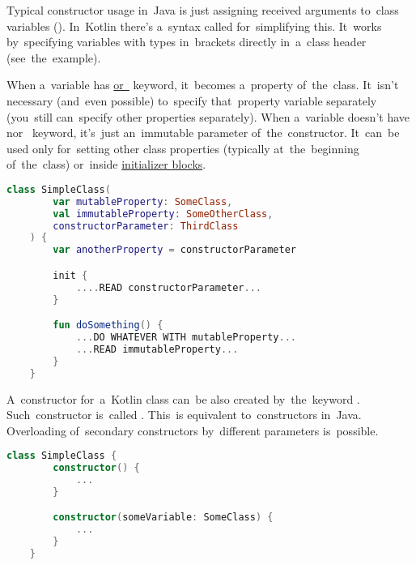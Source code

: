 \label{kotlinconstructor}
\label{kotlinprimaryconstructor}
Typical constructor usage in~Java is just assigning received arguments to~class variables ().
In~Kotlin there's a~syntax called  for~simplifying this.
It~works by~specifying variables with types in~brackets directly in~a~class header (see~the~example).

When a~variable has \hyperref[kotlinvalvar]{ or~} keyword, it~becomes \mbox{a property} of~the~class.
It~isn't necessary (and~even possible) to~specify that~property variable separately (you~still can~specify other properties separately).
When a~variable doesn't have  nor~ keyword, it's~just an~immutable parameter of~the~constructor.
It~can~be used only for~setting other class properties (typically at~the~beginning of~the~class) or~inside \hyperref[kotlininitblock]{initializer blocks}.

\begin{lstlisting}[language=Kotlin]
    class SimpleClass(
        var mutableProperty: SomeClass,
        val immutableProperty: SomeOtherClass,
        constructorParameter: ThirdClass
    ) {
        var anotherProperty = constructorParameter

        init {
            ....READ constructorParameter...
        }

        fun doSomething() {
            ...DO WHATEVER WITH mutableProperty...
            ...READ immutableProperty...
        }
    }
\end{lstlisting}
\newpage

\label{kotlinsecondaryconstructor}
A~constructor for~a~Kotlin class can~be also created by~the~keyword .
Such~constructor is~called .
This~is equivalent to~constructors in~Java.
Overloading of~secondary constructors by~different parameters is~possible.

\begin{lstlisting}[language=Kotlin]
    class SimpleClass {
        constructor() {
            ...
        }

        constructor(someVariable: SomeClass) {
            ...
        }
    }
\end{lstlisting}

